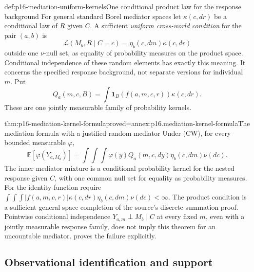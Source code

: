 \begin{hbdefinition}{def:p16-mediation-uniform-kernels}{One conditional product law for the response background}
For general standard Borel mediator spaces let \(\kappa(c,dr)\) be a
conditional law of \(R\) given \(C\). A sufficient \emph{uniform
cross-world condition} for the pair \((a,b)\) is
\[
 \mathcal L(M_b,R\mid C=c)=\eta_b(c,dm)\kappa(c,dr)          \tag{CW}
\]
outside one \(\nu\)-null set, as equality of probability measures on
the product space. Conditional independence of these random elements
has exactly this meaning. It concerns the specified response background,
not separate versions for individual \(m\). Put
\[
 Q_a(m,c,B)=\int\mathbf1_B(f(a,m,c,r))\kappa(c,dr).
\]
These are one jointly measurable family of probability kernels.
\end{hbdefinition}

\begin{hbtheorem}{thm:p16-mediation-kernel-formula}{proved=annex:p16.mediation-kernel-formula}{The mediation formula with a justified random mediator}
Under (CW), for every bounded measurable \(\varphi\),
\[
 \mathbb E[\varphi(Y_{a,M_b})]
 =\int\!\int\!\int\varphi(y)Q_a(m,c,dy)\eta_b(c,dm)\nu(dc).
\]
The inner mediator mixture is a conditional probability kernel for the
nested response given \(C\), with one common null set for equality as
probability measures. For the identity function require
\(\int\!\int\!\int|f(a,m,c,r)|\kappa(c,dr)\eta_b(c,dm)\nu(dc)<\infty\).
The product condition is a sufficient general-space completion of the
source's discrete summation proof. Pointwise conditional independence
\(Y_{a,m}\perp M_b\mid C\) at every fixed \(m\), even with a jointly
measurable response family, does not imply this theorem for an uncountable
mediator.  proves the failure explicitly.
\end{hbtheorem}

\subsection{Observational identification and support}


